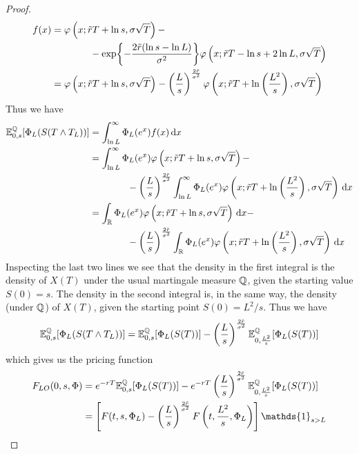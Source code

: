 \begin{proof}
    \begin{align*}
        f(x) &= \varphi\left(x;\Tilde{r}T+\ln s,\sigma\sqrt{T}\right) - \\
        &\qquad\qquad - \exp{-\frac{2\Tilde{r}(\ln s - \ln L)}{\sigma^2}}\varphi\left(x;\Tilde{r}T-\ln s+2\ln L, \sigma\sqrt{T}\right) \\
        &=
        \varphi\left(x;\Tilde{r}T+\ln s,\sigma\sqrt{T}\right) - \left(\frac{L}{s}\right)^{\frac{2\Tilde{r}}{\sigma^2}}\varphi\left(x;\Tilde{r}T+\ln \left(\frac{L^2}{s}\right), \sigma\sqrt{T}\right)
    \end{align*}
    Thus we have
    \begin{align*}
        \expect_{0,s}[\Phi_L(S(T\wedge T_L))] &= \int_{\ln L}^{\infty} \Phi_L(e^x)f(x)\,\dd x \\
        &=
        \int_{\ln L}^{\infty}\Phi_L(e^x)\varphi\left(x;\Tilde{r}T+\ln s,\sigma\sqrt{T}\right) - \\ %
        &\qquad\qquad
        - \left(\frac{L}{s}\right)^{\frac{2\Tilde{r}}{\sigma^2}} \int_{\ln L}^{\infty}\Phi_L(e^x) \varphi\left(x;\Tilde{r}T+\ln \left(\frac{L^2}{s}\right), \sigma\sqrt{T}\right)\,\dd x \\
        &=
        \int_{\mathbb{R}} \Phi_L(e^x) \varphi\left(x;\Tilde{r}T+\ln s,\sigma\sqrt{T}\right) \,\dd x - \\
        &\qquad\qquad
        - \left(\frac{L}{s}\right)^{\frac{2\Tilde{r}}{\sigma^2}} \int_{\mathbb{R}} \Phi_L(e^x) \varphi\left(x;\Tilde{r}T+\ln \left(\frac{L^2}{s}\right), \sigma\sqrt{T}\right)\,\dd x
    \end{align*}
    Inspecting the last two lines we see that the density in the first integral is the density of $X(T)$ under the usual martingale measure $\mathbb{Q}$, given the starting value $S(0) = s$. The density in the second integral is, in the same way, the density (under $\mathbb{Q}$) of $X(T)$, given the starting point $S(0) = L^2/s$. Thus we have
    \begin{equation*}
        \mathbb{E}^{\mathbb{Q}}_{0,s}[\Phi_L(S(T\wedge T_L))] = \mathbb{E}^{\mathbb{Q}}_{0,s}[\Phi_L(S(T))] - \left(\frac{L}{s}\right)^{\frac{2\Tilde{r}}{\sigma^2}} \mathbb{E}^{\mathbb{Q}}_{0,\frac{L^2}{s}}[\Phi_L(S(T))]
    \end{equation*}
    which gives us the pricing function
    \begin{align*}
        F_{LO}(0,s,\Phi) &= e^{-rT}\expect_{0,s}[\Phi_L(S(T))] - e^{-rT}\left(\frac{L}{s}\right)^{\frac{2\Tilde{r}}{\sigma^2}} \expect_{0,\frac{L^2}{s}}[\Phi_L(S(T))] \\
        &=
        \left[F(t,s,\Phi_L) - \left(\dfrac{L}{s}\right)^{\frac{2\Tilde{r}}{\sigma^2}}F\left(t,\frac{L^2}{s},\Phi_L\right)\right]\mathds{1}_{s>L}
    \end{align*}
\end{proof}
